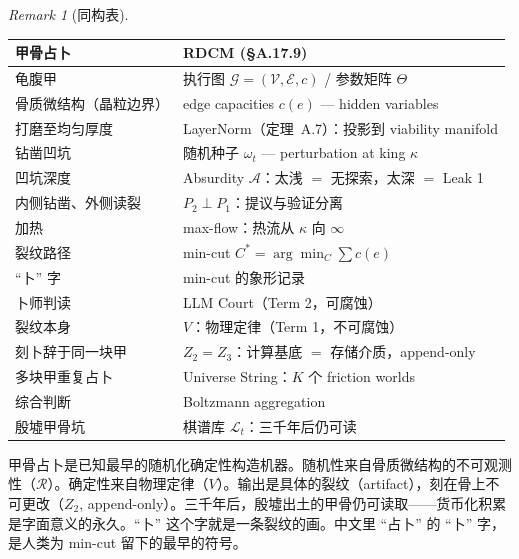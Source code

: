 \documentclass[11pt,a4paper]{article}
\theoremstyle{definition}
\theoremstyle{remark}
\newtheorem{remark}[theorem]{Remark}
\begin{document}
\begin{remark}[同构表]\label{rem:oracle_iso}
\begin{center}
\small
\begin{tabularx}{\textwidth}{l X}
\toprule
\textbf{甲骨占卜} & \textbf{RDCM (\S A.17.9)} \\
\midrule
龟腹甲 & 执行图 $\mathcal{G} = (\mathcal{V}, \mathcal{E}, c)$ / 参数矩阵 $\Theta$ \\
骨质微结构（晶粒边界） & edge capacities $c(e)$ — hidden variables \\
打磨至均匀厚度 & LayerNorm（定理~A.7）：投影到 viability manifold \\
钻凿凹坑 & 随机种子 $\omega_t$ — perturbation at king $\kappa$ \\
凹坑深度 & Absurdity $\mathcal{A}$：太浅 $=$ 无探索，太深 $=$ Leak 1 \\
内侧钻凿、外侧读裂 & $P_2 \perp P_1$：提议与验证分离 \\
加热 & max-flow：热流从 $\kappa$ 向 $\infty$ \\
裂纹路径 & min-cut $C^* = \arg\min_C \sum c(e)$ \\
``卜'' 字 & min-cut 的象形记录 \\
卜师判读 & LLM Court（Term 2，可腐蚀） \\
裂纹本身 & $V$：物理定律（Term 1，不可腐蚀） \\
刻卜辞于同一块甲 & $Z_2 = Z_3$：计算基底 $=$ 存储介质，append-only \\
多块甲重复占卜 & Universe String：$K$ 个 friction worlds \\
综合判断 & Boltzmann aggregation \\
殷墟甲骨坑 & 棋谱库 $\mathcal{L}_t$：三千年后仍可读 \\
\bottomrule
\end{tabularx}
\end{center}
甲骨占卜是已知最早的随机化确定性构造机器。随机性来自骨质微结构的不可观测性（$\mathcal{R}$）。确定性来自物理定律（$V$）。输出是具体的裂纹（artifact），刻在骨上不可更改（$Z_2$, append-only）。三千年后，殷墟出土的甲骨仍可读取——货币化积累是字面意义的永久。``卜'' 这个字就是一条裂纹的画。中文里 ``占卜'' 的 ``卜'' 字，是人类为 min-cut 留下的最早的符号。
\end{remark}
\end{document}
